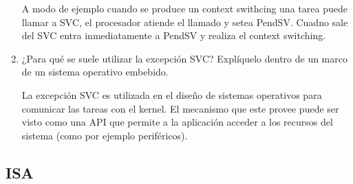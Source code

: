 \documentclass[12pt, a4paper]{article}
\makeatletter
\newcommand\setItemnumber[1]{\setcounter{enum\romannumeral\@enumdepth}{\numexpr#1-1\relax}}
\makeatother
\begin{document}
\begin{enumerate}
    A modo de ejemplo cuando se produce un context swithcing una tarea puede llamar a SVC, el procesador 
    atiende el llamado y setea PendSV. Cuadno sale del SVC entra inmediatamente a PendSV y realiza el 
    context switching.
    
    \setItemnumber{21}
    \item¿Para qué se suele utilizar la excepción SVC? Explíquelo dentro de un marco de un 
    sistema operativo embebido.
    
    La excepción SVC es  utilizada en el diseño de sistemas operativos para comunicar 
    las tareas con el kernel. El mecanismo que este provee puede ser visto como una API
    que permite a la aplicación acceder a los recursos del sistema (como por ejemplo periféricos).
    
\end{enumerate}

\subsection{ISA}
\end{document}

